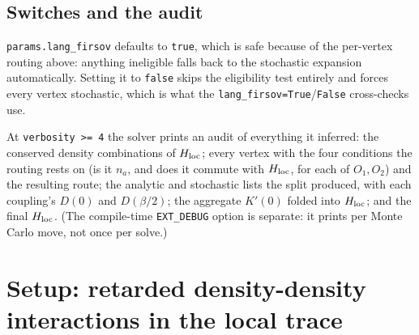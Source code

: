 \documentclass[a4paper,12pt]{article}
\newcommand{\Hloc}{\ensuremath{H_{\rm loc}}}
\begin{document}
\subsection{Switches and the audit}

\texttt{params.lang\_firsov} defaults to \texttt{true}, which is safe because of the
per-vertex routing above: anything ineligible falls back to the stochastic expansion
automatically. Setting it to \texttt{false} skips the eligibility test entirely and forces
every vertex stochastic, which is what the \texttt{lang\_firsov=True}/\texttt{False}
cross-checks use.

At \texttt{verbosity >= 4} the solver prints an audit of everything it inferred: the
conserved density combinations of $\Hloc$; every vertex with the four conditions the
routing rests on (is it $n_a$, and does it commute with $\Hloc$, for each of $O_1,O_2$)
and the resulting route; the analytic and stochastic lists the split produced, with each
coupling's $D(0)$ and $D(\beta/2)$; the aggregate $K'(0)$ folded into $\Hloc$; and the
final $\Hloc$. (The compile-time \texttt{EXT\_DEBUG} option is separate: it prints per
Monte Carlo move, not once per solve.)

\section{Setup: retarded density-density interactions in the local trace}
\label{sec:setup}
\end{document}
